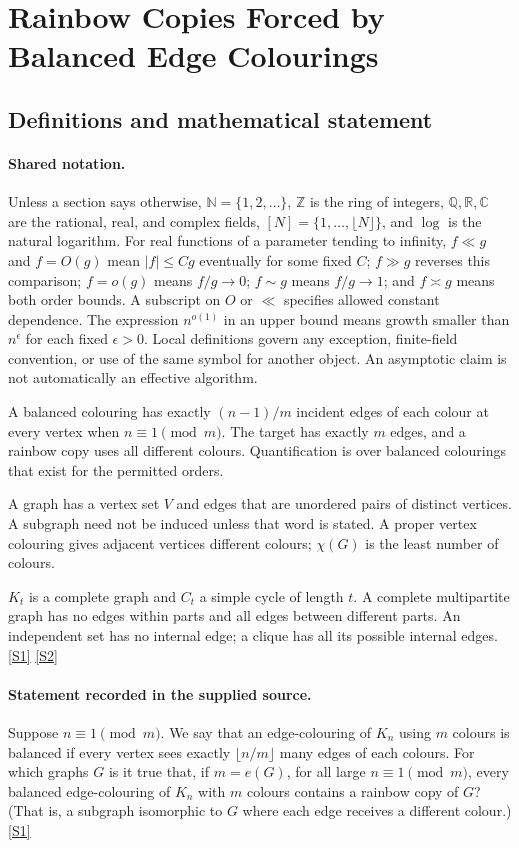 \documentclass[11pt,a4paper]{article}
\newcommand{\N}{\mathbb{N}}
\newcommand{\Z}{\mathbb{Z}}
\newcommand{\Q}{\mathbb{Q}}
\newcommand{\R}{\mathbb{R}}
\newcommand{\C}{\mathbb{C}}
\newcommand{\sref}[2]{\hyperlink{source:#1:#2}{[S#2]}}
\begin{document}
\section{Rainbow Copies Forced by Balanced Edge Colourings}\label{statement}


\subsection{Definitions and mathematical statement}

\paragraph{Shared notation.}Unless a section says otherwise, $\N=\{1,2,\ldots\}$,
$\Z$ is the ring of integers, $\Q,\R,\C$ are the rational, real, and complex
fields, $[N]=\{1,\ldots,\lfloor N\rfloor\}$, and $\log$ is the natural
logarithm. For real functions of a parameter tending to infinity,
$f\ll g$ and $f=O(g)$ mean $|f|\leq Cg$ eventually for some fixed $C$;
$f\gg g$ reverses this comparison; $f=o(g)$ means $f/g\to0$;
$f\sim g$ means $f/g\to1$; and $f\asymp g$ means both order bounds.
A subscript on $O$ or $\ll$ specifies allowed constant dependence.
The expression $n^{o(1)}$ in an upper bound means growth smaller than
$n^\epsilon$ for each fixed $\epsilon>0$. Local definitions govern any
exception, finite-field convention, or use of the same symbol for another
object. An asymptotic claim is not automatically an effective algorithm.



A balanced colouring has exactly $(n-1)/m$ incident edges of each colour at every vertex when $n\equiv1\pmod m$. The target has exactly $m$ edges, and a rainbow copy uses all different colours. Quantification is over balanced colourings that exist for the permitted orders.

A graph has a vertex set $V$ and edges that are unordered pairs of distinct vertices. A subgraph need not be induced unless that word is stated. A proper vertex colouring gives adjacent vertices different colours; $\chi(G)$ is the least number of colours.

$K_t$ is a complete graph and $C_t$ a simple cycle of length $t$. A complete multipartite graph has no edges within parts and all edges between different parts. An independent set has no internal edge; a clique has all its possible internal edges. \sref{statement}{1} \sref{statement}{2}

\paragraph{Statement recorded in the supplied source.}
Suppose $n\equiv 1\pmod{m}$. We say that an edge-colouring of $K_n$ using $m$ colours is balanced if every vertex sees exactly $\lfloor n/m\rfloor$ many edges of each colours.
For which graphs $G$ is it true that, if $m=e(G)$, for all large $n\equiv 1\pmod{m}$, every balanced edge-colouring of $K_n$ with $m$ colours contains a rainbow copy of $G$? (That is, a subgraph isomorphic to $G$ where each edge receives a different colour.) \sref{statement}{1}
\end{document}
